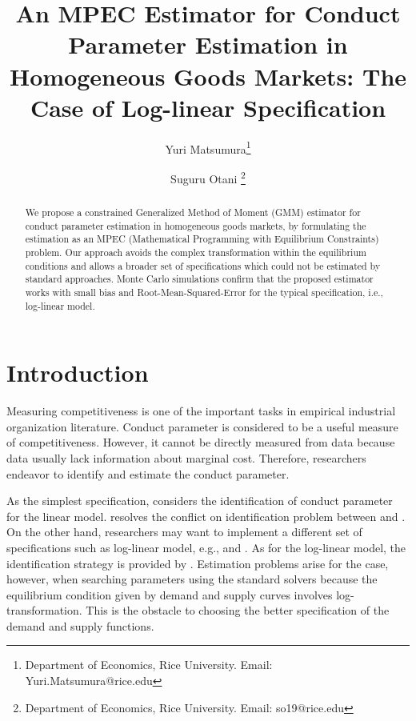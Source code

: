 \documentclass[11pt, a4paper]{article}
\title{An MPEC Estimator for Conduct Parameter Estimation in Homogeneous Goods Markets: The Case of Log-linear Specification}
\author{Yuri Matsumura\thanks{Department of Economics, Rice University. Email: Yuri.Matsumura@rice.edu} \and Suguru Otani \thanks{Department of Economics, Rice University. Email: so19@rice.edu
}}
\begin{document}
\maketitle
\begin{abstract}
    We propose a constrained Generalized Method of Moment (GMM) estimator for conduct parameter estimation in homogeneous goods markets, by formulating the estimation as an MPEC (Mathematical Programming with Equilibrium Constraints) problem. Our approach avoids the complex transformation within the equilibrium conditions and allows a broader set of specifications which could not be estimated by standard approaches. Monte Carlo simulations confirm that the proposed estimator works with small bias and Root-Mean-Squared-Error for the typical specification, i.e., log-linear model. %
\end{abstract}


\section{Introduction}
Measuring competitiveness is one of the important tasks in empirical industrial organization literature.
Conduct parameter is considered to be a useful measure of competitiveness. 
However, it cannot be directly measured from data because data usually lack information about marginal cost.
Therefore, researchers endeavor to identify and estimate the conduct parameter.

As the simplest specification, \citet{bresnahan1982oligopoly} considers the identification of conduct parameter for the linear model. \cite{matsumura2023resolving} resolves the conflict on identification problem between \cite{bresnahan1982oligopoly} and \cite{perloff2012collinearity}. 
On the other hand, researchers may want to implement a different set of specifications such as log-linear model, e.g., \cite{okazaki2022excess} and \cite{merel2009measuring}. As for the log-linear model, the identification strategy is provided by \citet{lau1982identifying}. 
Estimation problems arise for the case, however, when searching parameters using the standard solvers because the equilibrium condition given by demand and supply curves involves log-transformation. 
This is the obstacle to choosing the better specification of the demand and supply functions.
\end{document}
